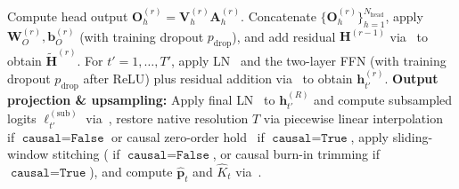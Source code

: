 \documentclass[lettersize,journal]{IEEEtran}
\begin{document}
\begin{algorithm}[t]
\begin{algorithmic}[1]
        \STATE Compute head output $\mathbf{O}_h^{(r)} = \mathbf{V}_h^{(r)} \mathbf{A}_h^{(r)}$.
      \ENDFOR
      \STATE Concatenate $\{\mathbf{O}_h^{(r)}\}_{h=1}^{N_{\mathrm{head}}}$, apply $\mathbf{W}_O^{(r)}, \mathbf{b}_O^{(r)}$ (with training dropout $p_{\mathrm{drop}}$), and add residual $\mathbf{H}^{(r-1)}$ via~ to obtain $\widetilde{\mathbf{H}}^{(r)}$.
      \STATE For $t' = 1, \dots, T'$, apply \acrshort{LN}~ and the two-layer \acrshort{FFN} (with training dropout $p_{\mathrm{drop}}$ after \acrshort{ReLU}) plus residual addition via~ to obtain $\mathbf{h}_{t'}^{(r)}$.
    \ENDFOR
    \STATE \textbf{Output projection \& upsampling:} Apply final \acrshort{LN}~ to $\mathbf{h}_{t'}^{(R)}$ and compute subsampled logits $\bm{\ell}_{t'}^{(\mathrm{sub})}$ via~, restore native resolution $T$ via piecewise linear interpolation~ if $\texttt{causal} = \texttt{False}$ or causal zero-order hold~ if $\texttt{causal} = \texttt{True}$, apply sliding-window stitching ( if $\texttt{causal} = \texttt{False}$, or causal burn-in trimming if $\texttt{causal} = \texttt{True}$), and compute $\widehat{\mathbf{p}}_t$ and $\widehat{K}_t$ via~.
  \end{algorithmic}
\end{algorithm}
\end{document}

